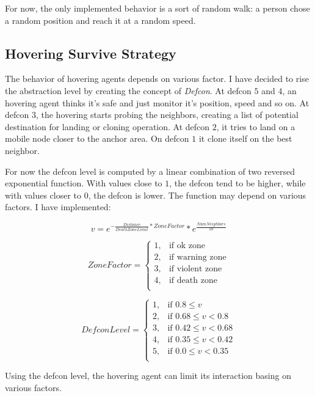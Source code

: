 For now, the only implemented behavior is a sort of random walk: a person chose
a random position and reach it at a random speed.

\subsection{Hovering Survive Strategy}

The behavior of hovering agents depends on various factor. I have decided to
rise the abstraction level by creating the concept of \emph{Defcon}. At defcon
$5$ and $4$, an hovering agent thinks it's safe and just monitor it's position,
speed and so on. At defcon $3$, the hovering starts probing the neighbors,
creating a list of potential destination for landing or cloning operation. At
defcon $2$, it tries to land on a mobile node closer to the anchor area. On
defcon $1$ it clone itself on the best neighbor.

For now the defcon level is computed by a linear combination of two reversed
exponential function. With values close to $1$, the defcon tend to be higher,
while with values closer to $0$, the defcon is lower. The function may depend
on various factors. I have implemented:

\[
  v = e^{-\frac{Distance}{DeathZoneLimit}*ZoneFactor} * e^{\frac{NumNeighbors}{10}}
\]

\[
  ZoneFactor = \begin{cases}
    1, & \mbox{if } \mbox{ok zone} \\
    2, & \mbox{if } \mbox{warning zone} \\
    3, & \mbox{if } \mbox{violent zone} \\
    4, & \mbox{if } \mbox{death zone} \\
    \end{cases}
\]

\[
  DefconLevel = \begin{cases}
    1, & \mbox{if } 0.8  \leq v \\
    2, & \mbox{if } 0.68 \leq v < 0.8  \\
    3, & \mbox{if } 0.42 \leq v < 0.68  \\
    4, & \mbox{if } 0.35 \leq v < 0.42  \\
    5, & \mbox{if } 0.0  \leq v < 0.35  \\
    \end{cases}
\]

Using the defcon level, the hovering agent can limit its interaction basing on
various factors.

